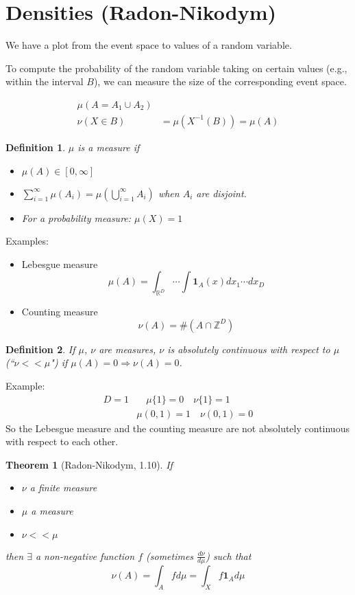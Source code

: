 \documentclass{article}
\newtheorem*{defn}{Definition}
\newtheorem{thm}{Theorem}[section]
\newcommand{\R}{\mathbb{R}}
\newcommand{\Z}{\mathbb{Z}}
\begin{document}
\section{Densities (Radon-Nikodym)}
We have a plot from the event space to values of a random variable.

To compute the probability of the random variable taking on certain values
(e.g., within the interval $B$), we can measure the size of the corresponding
event space.

\begin{align*}
\mu(A = A_1 \cup A_2) \\
\nu(X \in B) &= \mu(X^{-1}(B)) = \mu(A)
\end{align*}

\begin{defn}
  $\mu$ is a measure if
  \begin{itemize}
    \item $\mu(A) \in [0, \infty]$
    \item $\sum_{i=1}^\infty \mu(A_i) = \mu\left(\bigcup_{i=1}^\infty
      A_i\right)$ when $A_i$ are disjoint.
    \item For a probability measure: $\mu(X) = 1$
  \end{itemize}
\end{defn}

Examples:
\begin{itemize}
  \item Lebesgue measure
    \[ \mu(A) = \int_{\R^D} \cdots \int \mathbf{1}_A(x) dx_1 \cdots dx_D \]
  \item Counting measure
    \[ \nu(A) = \#(A \cap \Z^D) \]
\end{itemize}

\begin{defn}
  If $\mu$, $\nu$ are measures, $\nu$ is absolutely continuous with respect to
  $\mu$ (``$\nu << \mu$") if $\mu(A) = 0 \Rightarrow \nu(A) = 0$.
\end{defn}
Example:
\begin{align*}
  D = 1 &\quad \mu\{1\} = 0 \quad \nu\{1\} = 1 \\
  & \mu(0, 1) = 1 \quad \nu(0, 1) = 0
\end{align*}
So the Lebesgue measure and the counting measure are not absolutely continuous
with respect to each other.

\begin{thm}[Radon-Nikodym, 1.10]
  If 
  \begin{itemize}
    \item $\nu$ a finite measure
    \item $\mu$ a measure
    \item $\nu << \mu$
  \end{itemize}
  then $\exists$ a non-negative function $f$ (sometimes $\frac{d\nu}{d\mu}$)
  such that \[\nu(A) = \int_A f d\mu = \int_X f \mathbf{1}_A d\mu\]
\end{thm}
\end{document}
